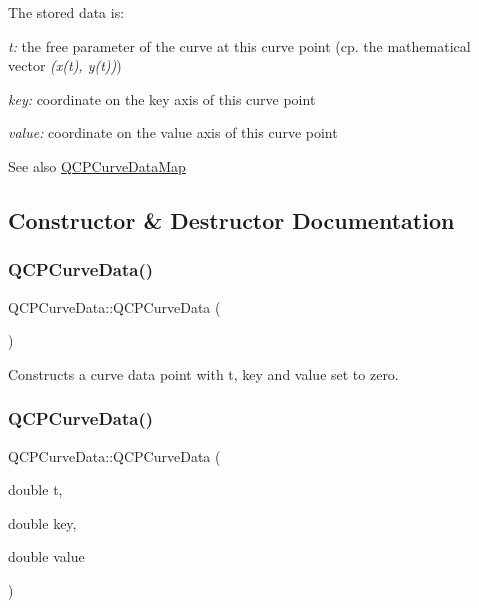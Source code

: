 The stored data is\+: \begin{DoxyItemize}
\item {\itshape t\+:} the free parameter of the curve at this curve point (cp. the mathematical vector {\itshape (x(t), y(t))}) \item {\itshape key\+:} coordinate on the key axis of this curve point \item {\itshape value\+:} coordinate on the value axis of this curve point\end{DoxyItemize}
\begin{DoxySeeAlso}{See also}
\hyperlink{qcustomplot_8h_a444d37ec9cb2951b3a7fe443c34d1658}{Q\+C\+P\+Curve\+Data\+Map} 
\end{DoxySeeAlso}


\subsection{Constructor \& Destructor Documentation}
\hypertarget{class_q_c_p_curve_data_a48252779b5198a509d99c69ae223fbf8}{}\label{class_q_c_p_curve_data_a48252779b5198a509d99c69ae223fbf8} 
\subsubsection{\texorpdfstring{Q\+C\+P\+Curve\+Data()}{QCPCurveData()}\hspace{0.1cm}{\footnotesize\ttfamily [1/2]}}
{\footnotesize\ttfamily Q\+C\+P\+Curve\+Data\+::\+Q\+C\+P\+Curve\+Data (\begin{DoxyParamCaption}{ }\end{DoxyParamCaption})}

Constructs a curve data point with t, key and value set to zero. \hypertarget{class_q_c_p_curve_data_a3586be0cc6f8db15bcdd0c0d03b0c173}{}\label{class_q_c_p_curve_data_a3586be0cc6f8db15bcdd0c0d03b0c173} 
\subsubsection{\texorpdfstring{Q\+C\+P\+Curve\+Data()}{QCPCurveData()}\hspace{0.1cm}{\footnotesize\ttfamily [2/2]}}
{\footnotesize\ttfamily Q\+C\+P\+Curve\+Data\+::\+Q\+C\+P\+Curve\+Data (\begin{DoxyParamCaption}\item[{double}]{t,  }\item[{double}]{key,  }\item[{double}]{value }\end{DoxyParamCaption})}

